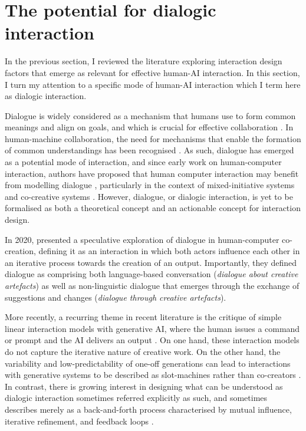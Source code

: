 \section{The potential for dialogic interaction}

In the previous section, I reviewed the literature exploring interaction design factors that emerge as relevant for effective human-AI interaction. In this section, I turn my attention to a specific mode of human-AI interaction which I term here as dialogic interaction.

Dialogue is widely considered as a mechanism that humans use to form common meanings and align on goals, and which is crucial for effective collaboration \cite{Bohm1996-fo}. In human-machine collaboration, the need for mechanisms that enable the formation of common understandings has been recognised \cite{Dafoe2021-in}. As such, dialogue has emerged as a potential mode of interaction, and since early work on human-computer interaction, authors have proposed that human computer interaction may benefit from modelling dialogue \cite{Hayes1983-ca}, particularly in the context of mixed-initiative systems and co-creative systems \cite{Allen1999-sr, Yannakakis2014-zs, Deterding2017-wh}. However, dialogue, or dialogic interaction, is yet to be formalised as both a theoretical concept and an actionable concept for interaction design. 

In 2020, \cite{Bown2020-oc} presented a speculative exploration of dialogue in human-computer co-creation, defining it as an interaction in which both actors influence each other in an iterative process towards the creation of an output. Importantly, they defined dialogue as comprising both language-based conversation (\textit{dialogue about creative artefacts}) as well as non-linguistic dialogue that emerges through the exchange of suggestions and changes (\textit{dialogue through creative artefacts}).

More recently, a recurring theme in recent literature is the critique of simple linear interaction models with generative AI, where the human issues a command or prompt and the AI delivers an output \cite{Zhou2024-vp, Lin2023-jd, Tholander2023-rv}. On one hand, these interaction models do not capture the iterative nature of creative work. On the other hand, the variability and low-predictability of one-off generations can lead to interactions with generative systems to be described as slot-machines rather than co-creators \cite{Dylan2023-ma}. In contrast, there is growing interest in designing what can be understood as dialogic interaction sometimes referred explicitly as such, and sometimes describes merely as a back-and-forth process characterised by mutual influence, iterative refinement, and feedback loops \cite{Bown2020-oc, Gomez2023-bp, Wang2021-uy, Zhou2024-vp, Ghajargar2022-af, Feldman2017-ip}.

